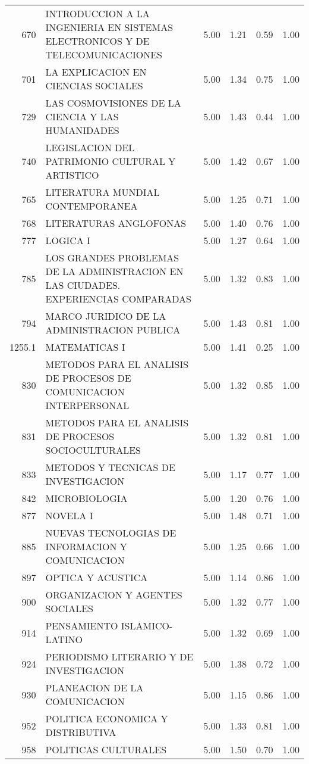 \begin{table}[ht]
\begin{tabular}{rlrrrr}
  670 & INTRODUCCION A LA INGENIERIA EN SISTEMAS ELECTRONICOS Y DE TELECOMUNICACIONES & 5.00 & 1.21 & 0.59 & 1.00 \\ 
  701 & LA EXPLICACION EN CIENCIAS SOCIALES & 5.00 & 1.34 & 0.75 & 1.00 \\ 
  729 & LAS COSMOVISIONES DE LA CIENCIA Y LAS HUMANIDADES & 5.00 & 1.43 & 0.44 & 1.00 \\ 
  740 & LEGISLACION DEL PATRIMONIO CULTURAL Y ARTISTICO & 5.00 & 1.42 & 0.67 & 1.00 \\ 
  765 & LITERATURA MUNDIAL CONTEMPORANEA & 5.00 & 1.25 & 0.71 & 1.00 \\ 
  768 & LITERATURAS ANGLOFONAS & 5.00 & 1.40 & 0.76 & 1.00 \\ 
  777 & LOGICA I & 5.00 & 1.27 & 0.64 & 1.00 \\ 
  785 & LOS GRANDES PROBLEMAS DE LA ADMINISTRACION EN LAS CIUDADES. EXPERIENCIAS COMPARADAS & 5.00 & 1.32 & 0.83 & 1.00 \\ 
  794 & MARCO JURIDICO DE LA ADMINISTRACION PUBLICA & 5.00 & 1.43 & 0.81 & 1.00 \\ 
  1255.1 & MATEMATICAS I & 5.00 & 1.41 & 0.25 & 1.00 \\ 
  830 & METODOS PARA EL ANALISIS DE PROCESOS DE COMUNICACION INTERPERSONAL & 5.00 & 1.32 & 0.85 & 1.00 \\ 
  831 & METODOS PARA EL ANALISIS DE PROCESOS SOCIOCULTURALES & 5.00 & 1.32 & 0.81 & 1.00 \\ 
  833 & METODOS Y TECNICAS DE INVESTIGACION & 5.00 & 1.17 & 0.77 & 1.00 \\ 
  842 & MICROBIOLOGIA & 5.00 & 1.20 & 0.76 & 1.00 \\ 
  877 & NOVELA I & 5.00 & 1.48 & 0.71 & 1.00 \\ 
  885 & NUEVAS TECNOLOGIAS DE INFORMACION Y COMUNICACION & 5.00 & 1.25 & 0.66 & 1.00 \\ 
  897 & OPTICA Y ACUSTICA & 5.00 & 1.14 & 0.86 & 1.00 \\ 
  900 & ORGANIZACION Y AGENTES SOCIALES & 5.00 & 1.32 & 0.77 & 1.00 \\ 
  914 & PENSAMIENTO ISLAMICO-LATINO & 5.00 & 1.32 & 0.69 & 1.00 \\ 
  924 & PERIODISMO LITERARIO Y DE INVESTIGACION & 5.00 & 1.38 & 0.72 & 1.00 \\ 
  930 & PLANEACION DE LA COMUNICACION & 5.00 & 1.15 & 0.86 & 1.00 \\ 
  952 & POLITICA ECONOMICA Y DISTRIBUTIVA & 5.00 & 1.33 & 0.81 & 1.00 \\ 
  958 & POLITICAS CULTURALES & 5.00 & 1.50 & 0.70 & 1.00 \\ 

\end{tabular}
\end{table}
